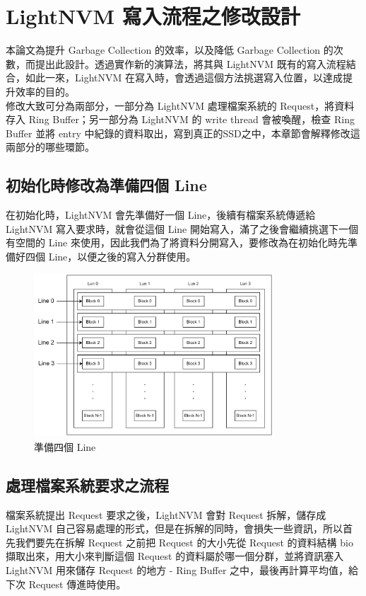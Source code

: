 \chapter{LightNVM 寫入流程之修改設計}
\indent
本論文為提升 Garbage Collection 的效率，以及降低 Garbage Collection 的次數，而提出此設計。透過實作新的演算法，將其與 LightNVM 既有的寫入流程結合，如此一來，LightNVM 在寫入時，會透過這個方法挑選寫入位置，以達成提升效率的目的。\\
\indent
修改大致可分為兩部分，一部分為 LightNVM 處理檔案系統的 Request，將資料存入 Ring Buffer；另一部分為 LightNVM 的 write thread 會被喚醒，檢查 Ring Buffer 並將 entry 中紀錄的資料取出，寫到真正的SSD之中，本章節會解釋修改這兩部分的哪些環節。

\section{初始化時修改為準備四個 Line}\label{s3.1}
\indent
在初始化時，LightNVM 會先準備好一個 Line，後續有檔案系統傳遞給 LightNVM 寫入要求時，就會從這個 Line 開始寫入，滿了之後會繼續挑選下一個有空間的 Line 來使用，因此我們為了將資料分開寫入，要修改為在初始化時先準備好四個 Line，以便之後的寫入分群使用。

\begin{figure}[H]
    \centering
    \includegraphics[width=0.8\textwidth]{picture/ch3/4Line.png}
    \caption{準備四個 Line}
    \label{f3.1}
\end{figure}

\section{處理檔案系統要求之流程}\label{s3.2}
\indent
檔案系統提出 Request 要求之後，LightNVM 會對 Request 拆解，儲存成 LightNVM 自己容易處理的形式，但是在拆解的同時，會損失一些資訊，所以首先我們要先在拆解 Request 之前把 Request 的大小先從 Request 的資料結構 bio 擷取出來，用大小來判斷這個 Request 的資料屬於哪一個分群，並將資訊塞入 LightNVM 用來儲存 Request 的地方 - Ring Buffer 之中，最後再計算平均值，給下次 Request 傳進時使用。\cite{LightNVM}
\newpage

